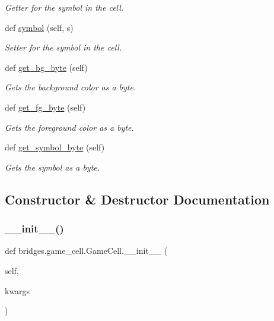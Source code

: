 \begin{DoxyCompactItemize}
\begin{DoxyCompactList}\small\item\em Getter for the symbol in the cell. \end{DoxyCompactList}\item 
def \hyperlink{classbridges_1_1game__cell_1_1_game_cell_a2ce9aa7d7d7835c511338c65a1457e22}{symbol} (self, s)
\begin{DoxyCompactList}\small\item\em Setter for the symbol in the cell. \end{DoxyCompactList}\item 
def \hyperlink{classbridges_1_1game__cell_1_1_game_cell_a5ab6deab003f6c35d7bd8f18d4fecf7b}{get\+\_\+bg\+\_\+byte} (self)
\begin{DoxyCompactList}\small\item\em Gets the background color as a byte. \end{DoxyCompactList}\item 
def \hyperlink{classbridges_1_1game__cell_1_1_game_cell_af03e7efba5661d3a9fd1e14dc3128fc5}{get\+\_\+fg\+\_\+byte} (self)
\begin{DoxyCompactList}\small\item\em Gets the foreground color as a byte. \end{DoxyCompactList}\item 
def \hyperlink{classbridges_1_1game__cell_1_1_game_cell_ac61e8e3f172dc2a5e2d2cb32426a089b}{get\+\_\+symbol\+\_\+byte} (self)
\begin{DoxyCompactList}\small\item\em Gets the symbol as a byte. \end{DoxyCompactList}\end{DoxyCompactItemize}


\subsection{Constructor \& Destructor Documentation}
\mbox{\label{classbridges_1_1game__cell_1_1_game_cell_a5f604c05c0d42179a09ace913302d57b}} 
\subsubsection{\texorpdfstring{\+\_\+\+\_\+init\+\_\+\+\_\+()}{\_\_init\_\_()}}
{\footnotesize\ttfamily def bridges.\+game\+\_\+cell.\+Game\+Cell.\+\_\+\+\_\+init\+\_\+\+\_\+ (\begin{DoxyParamCaption}\item[{}]{self,  }\item[{}]{kwargs }\end{DoxyParamCaption})}



